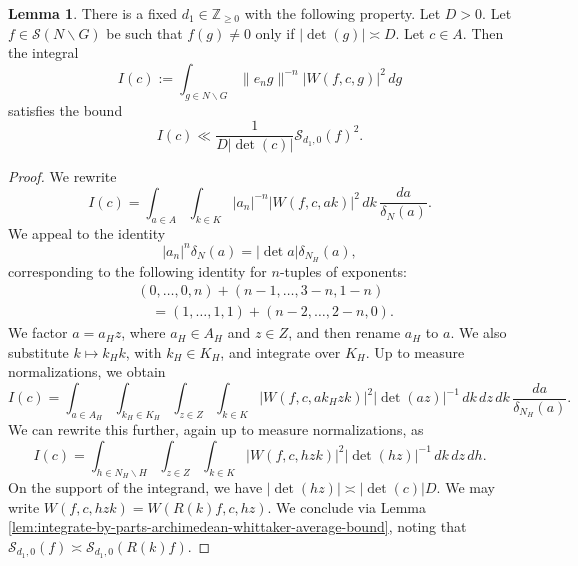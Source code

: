 \documentclass[reqno]{amsart}
\theoremstyle{plain} \newtheorem{theorem} {Theorem}
\theoremstyle{definition} \newtheorem{definition} [theorem] {Definition}
\theoremstyle{itplain} %
\newtheorem{lemma}[theorem]{Lemma}
\numberwithin{equation}{section}
\numberwithin{theorem}{section}
\renewcommand{\geq}{\geqslant}
\begin{document}
\begin{lemma}\label{lem:sub-gln:let-f-in-1}
  There is a fixed $d_1 \in \mathbb{Z}_{\geq 0}$ with the following property.  Let $D > 0$.  Let $f \in \mathcal{S}(N \backslash G)$ be such that $f(g) \neq 0$ only if $|\det(g)| \asymp D$.  Let $c \in A$.  Then the integral
  \begin{equation*}
    I(c) :=
    \int _{g \in N \backslash G}
    \|e_n g\|^{-n}
    |W(f, c, g)|^2  \, d g
  \end{equation*}
  satisfies the bound
  \begin{equation}\label{eq:ic-ll-detc}
    I(c) \ll \frac{1}{D |\det(c)|} \mathcal{S}_{d_1,0}(f)^2.
  \end{equation}
\end{lemma}
\begin{proof}
  We rewrite
  \begin{equation*}
    I(c) = 
    \int _{a \in A}
    \int _{k \in K}
    |a_n|^{-n}
    |W(f, c, a k)|^2 \, d k \, \frac{d a}{\delta_N(a)}.
  \end{equation*}
  We appeal to the identity
  \begin{equation*}
    |a_n|^n \delta_N(a) = |\det a| \delta_{N_H}(a),
  \end{equation*}
  corresponding to the following identity for $n$-tuples of exponents:
  \begin{align*}
    &\left( 0, \dotsc, 0, n \right) + \left( n-1, \dotsc, 3-n, 1 - n \right) \\
    &\quad =
    \left( 1, \dotsc, 1, 1 \right)
    +
    \left( n-2, \dotsc, 2-n, 0 \right).
  \end{align*}
  We factor $a = a_H z$, where $a_H \in A_H$ and $z \in Z$, and then rename $a_H$ to $a$.  We also substitute $k \mapsto k_H k$, with $k_H \in K_H$, and integrate over $K_H$.  Up to measure normalizations, we obtain
  \begin{equation*}
    I(c) = 
    \int _{a \in A_H}
    \int _{k_H \in K_H}
    \int _{z \in Z}
    \int _{k \in K}
    |W(f, c, a k_H z k)|^2
    |\det(a z)|^{-1} 
    \, d k \, d z \, d k \, \frac{d a}{\delta_{N_H}(a)}.
  \end{equation*}
  We can rewrite this further, again up to measure normalizations, as
  \begin{equation*}
    I(c) = 
    \int _{h \in N_H \backslash H}
    \int _{z \in Z}
    \int _{k \in K}
    |W(f, c, h z k)|^2
    |\det(h z)|^{-1} 
    \, d k \, d z \, d h.
  \end{equation*}
  On the support of the integrand, we have $|\det(h z)| \asymp |\det(c)| D$.  We may write $W(f,c,h z k) = W(R(k) f,c,h z)$.  We conclude via Lemma \ref{lem:integrate-by-parts-archimedean-whittaker-average-bound}, noting that $\mathcal{S}_{d_1,0}(f) \asymp \mathcal{S}_{d_1,0}(R(k) f)$.
\end{proof}
\end{document}
